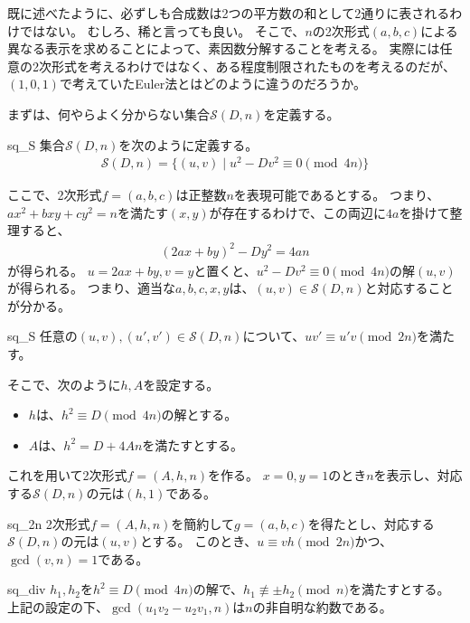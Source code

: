 既に述べたように、必ずしも合成数は2つの平方数の和として2通りに表されるわけではない。
むしろ、稀と言っても良い。
そこで、$n$の2次形式$(a,b,c)$による異なる表示を求めることによって、素因数分解することを考える。
実際には任意の2次形式を考えるわけではなく、ある程度制限されたものを考えるのだが、$(1,0,1)$で考えていたEuler法とはどのように違うのだろうか。

まずは、何やらよく分からない集合$\mathcal{S}(D,n)$を定義する。

\begin{Defi}{}{sq_S}
集合$\mathcal{S}(D,n)$を次のように定義する。
\begin{align*}
\mathcal{S}(D,n) = \{(u,v) \mid u^2 - Dv^2 \equiv 0\pmod{4n}\}
\end{align*}
\end{Defi}

ここで、2次形式$f=(a,b,c)$は正整数$n$を表現可能であるとする。
つまり、$ax^2+bxy+cy^2=n$を満たす$(x,y)$が存在するわけで、この両辺に$4a$を掛けて整理すると、
\begin{align*}
(2ax + by)^2 -Dy^2 = 4an
\end{align*}
が得られる。
$u=2ax + by, v=y$と置くと、$u^2 - Dv^2\equiv0\pmod{4n}$の解$(u,v)$が得られる。
つまり、適当な$a,b,c,x,y$は、$(u,v)\in\mathcal{S}(D,n)$と対応することが分かる。

\begin{Prop}{}{sq_S}
任意の$(u,v),(u',v')\in\mathcal{S}(D,n)$について、$uv'\equiv u'v\pmod{2n}$を満たす。
\end{Prop}

そこで、次のように$h,A$を設定する。
\begin{itemize}
\item $h$は、$h^2\equiv D\pmod{4n}$の解とする。
\item $A$は、$h^2=D+4An$を満たすとする。
\end{itemize}
これを用いて2次形式$f=(A,h,n)$を作る。
$x=0,y=1$のとき$n$を表示し、対応する$\mathcal{S}(D,n)$の元は$(h,1)$である。

\begin{Prop}{}{sq_2n}
2次形式$f=(A,h,n)$を簡約して$g=(a,b,c)$を得たとし、対応する$\mathcal{S}(D,n)$の元は$(u,v)$とする。
このとき、$u\equiv vh \pmod{2n}$かつ、$\gcd(v,n)=1$である。
\end{Prop}

\begin{Prop}{}{sq_div}
$h_1,h_2$を$h^2\equiv D\pmod{4n}$の解で、$h_1\not\equiv\pm h_2\pmod{n}$を満たすとする。
上記の設定の下、$\gcd(u_1v_2 - u_2v_1, n)$は$n$の非自明な約数である。
\end{Prop}

